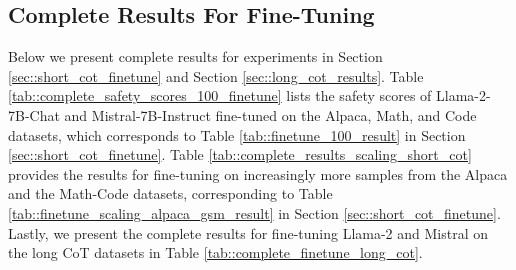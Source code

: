 \subsection{Complete Results For Fine-Tuning}
\label{sec::complete_results_finetuning}
\par Below we present complete results for experiments in Section \ref{sec::short_cot_finetune} and Section \ref{sec::long_cot_results}. Table \ref{tab::complete_safety_scores_100_finetune} lists the safety scores of Llama-2-7B-Chat \citep{touvron2023llama2} and Mistral-7B-Instruct \citep{jiang2023mistral} fine-tuned on the Alpaca, Math, and Code datasets, which corresponds to Table \ref{tab::finetune_100_result} in Section \ref{sec::short_cot_finetune}. Table \ref{tab::complete_results_scaling_short_cot} provides the results for fine-tuning on increasingly more samples from the Alpaca and the Math-Code datasets, corresponding to Table \ref{tab::finetune_scaling_alpaca_gsm_result} in Section \ref{sec::short_cot_finetune}. Lastly, we present the complete results for fine-tuning Llama-2 and Mistral on the long CoT datasets in Table \ref{tab::complete_finetune_long_cot}.


